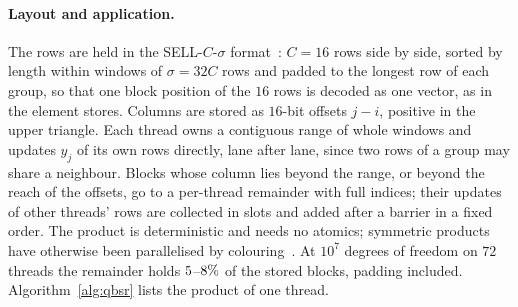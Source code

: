 \documentclass[sigconf,balance=false]{acmart}
\begin{document}
\paragraph{Layout and application.}  The rows are held in the SELL-$C$-$\sigma$
format~\cite{Kreutzer2014}: $C=16$ rows side by side, sorted by length within windows of
$\sigma=32C$ rows and padded to the longest row of each group, so that one block position of the
$16$ rows is decoded as one vector, as in the element stores.  Columns are stored as $16$-bit offsets
$j-i$, positive in the upper triangle.  Each thread owns a contiguous range of whole windows and
updates $y_j$ of its own rows directly, lane after lane, since two rows of a group may share a
neighbour.  Blocks whose column lies beyond the range, or beyond the reach of the offsets, go to a
per-thread remainder with full indices; their updates of other threads' rows are collected in slots
and added after a barrier in a fixed order.  The product is deterministic and needs no atomics;
symmetric products have otherwise been parallelised by colouring~\cite{Alappat2020,Elafrou2019}.  At
$10^7$ degrees of freedom on $72$ threads the remainder holds $5$--$8\%$
of the stored blocks, padding included.  Algorithm~\ref{alg:qbsr} lists the product of one thread.
\end{document}
